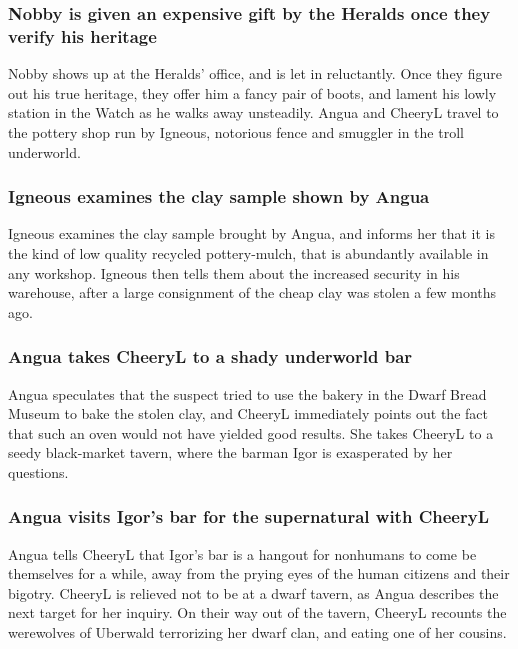 \subsubsection{\Gls{Nobby} is given an expensive gift by the Heralds once they verify his heritage}
\Gls{Nobby} shows up at the Heralds' office, and is let in reluctantly. Once they figure out his
true heritage, they offer him a fancy pair of boots, and lament his lowly station in the Watch as
he walks away unsteadily. \Gls{Angua} and \Gls{CheeryL} travel to the pottery shop run by
\Gls{Igneous}, notorious fence and smuggler in the troll underworld.

\subsubsection{\Gls{Igneous} examines the clay sample shown by \Gls{Angua}}
\Gls{Igneous} examines the clay sample brought by \Gls{Angua}, and informs her that it is the kind
of low quality recycled pottery-mulch, that is abundantly available in any workshop. \Gls{Igneous}
then tells them about the increased security in his warehouse, after a large consignment of the
cheap clay was stolen a few months ago.

\subsubsection{\Gls{Angua} takes \Gls{CheeryL} to a shady underworld bar}
\Gls{Angua} speculates that the suspect tried to use the bakery in the Dwarf Bread Museum to bake
the stolen clay, and \Gls{CheeryL} immediately points out the fact that such an oven would not
have yielded good results. She takes \Gls{CheeryL} to a seedy black-market tavern, where the barman
\Gls{Igor} is exasperated by her questions.

\subsubsection{\Gls{Angua} visits \Gls{Igor}'s bar for the supernatural with \Gls{CheeryL}}
\Gls{Angua} tells \Gls{CheeryL} that \Gls{Igor}'s bar is a hangout for nonhumans to come be
themselves for a while, away from the prying eyes of the human citizens and their bigotry.
\Gls{CheeryL} is relieved not to be at a dwarf tavern, as \Gls{Angua} describes the next target for
her inquiry. On their way out of the tavern, \Gls{CheeryL} recounts the werewolves of Uberwald
terrorizing her dwarf clan, and eating one of her cousins.

